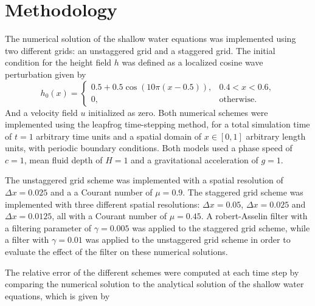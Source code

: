 \section{Methodology}
The numerical solution of the shallow water equations was implemented using two different grids: an unstaggered grid and a staggered grid. The initial condition for the height field $h$ was defined as a localized cosine wave perturbation given by
\begin{equation}
    h_0(x) = 
    \begin{cases}
        0.5 + 0.5 \cos\left(10 \pi (x-0.5)\right), & 0.4 < x < 0.6, \\
        0, & \text{otherwise.}
    \end{cases}
\end{equation}
And a velocity field $u$ initialized as zero. Both numerical schemes were implemented using the leapfrog time-stepping method, for a total simulation time of $t=1$ arbitrary time units and a spatial domain of $x \in [0,1]$ arbitrary length units, with periodic boundary conditions. Both models used a phase speed of $c=1$, mean fluid depth of $H=1$ and a gravitational acceleration of $g=1$. 

The unstaggered grid scheme was implemented with a spatial resolution of $\Delta x = 0.025$ and a a Courant number of $\mu=0.9$. The staggered grid scheme was implemented with three different spatial resolutions: $\Delta x = 0.05$, $\Delta x = 0.025$ and $\Delta x = 0.0125$, all with a Courant number of $\mu=0.45$. A robert-Asselin filter with a filtering parameter of $\gamma=0.005$ was applied to the staggered grid scheme, while a filter with $\gamma=0.01$ was applied to the unstaggered grid scheme in order to evaluate the effect of the filter on these numerical solutions.

The relative error of the different schemes were computed at each time step by comparing the numerical solution to the analytical solution of the shallow water equations, which is given by 
